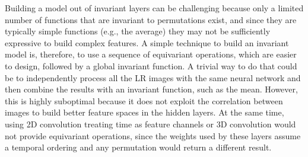 \documentclass[journal]{IEEEtran}
\begin{document}
Building a model out of invariant layers can be challenging because only a limited number of functions that are invariant to permutations exist, and since they are typically simple functions (e.g., the average) they may not be sufficiently expressive to build complex features. A simple technique to build an invariant model is, therefore, to use a sequence of equivariant operations, which are easier to design, followed by a global invariant function.
A trivial way to do that could be to independently process all the LR images with the same neural network and then combine the results with an invariant function, such as the mean. However, this is highly suboptimal because it does not exploit the correlation between images to build better feature spaces in the hidden layers. At the same time, using 2D convolution treating time as feature channels or 3D convolution would not provide equivariant operations, since the weights used by these layers assume a temporal ordering and any permutation would return a different result.
\end{document}
